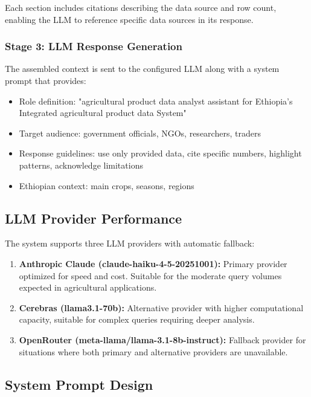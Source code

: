 Each section includes citations describing the data source and row count, enabling the LLM to reference specific data sources in its response.

\subsubsection{Stage 3: LLM Response Generation}

The assembled context is sent to the configured LLM along with a system prompt that provides:
\begin{itemize}
  \item Role definition: "agricultural product data analyst assistant for Ethiopia's Integrated agricultural product data System"
  \item Target audience: government officials, NGOs, researchers, traders
  \item Response guidelines: use only provided data, cite specific numbers, highlight patterns, acknowledge limitations
  \item Ethiopian context: main crops, seasons, regions
\end{itemize}

\subsection{LLM Provider Performance}

The system supports three LLM providers with automatic fallback:

\begin{enumerate}
  \item \textbf{Anthropic Claude (claude-haiku-4-5-20251001):} Primary provider optimized for speed and cost. Suitable for the moderate query volumes expected in agricultural applications.
  \item \textbf{Cerebras (llama3.1-70b):} Alternative provider with higher computational capacity, suitable for complex queries requiring deeper analysis.
  \item \textbf{OpenRouter (meta-llama/llama-3.1-8b-instruct):} Fallback provider for situations where both primary and alternative providers are unavailable.
\end{enumerate}

\subsection{System Prompt Design}


